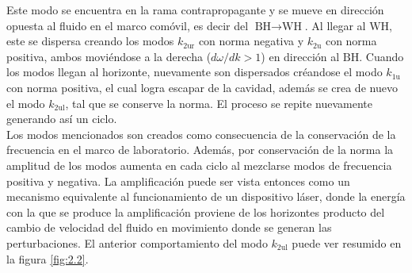 Este modo se encuentra en la rama contrapropagante y se mueve en direcci\'{o}n opuesta al fluido en el marco com\'{o}vil, es decir del $\text{BH}\rightarrow \text{WH}$. Al llegar al $\text{WH}$, este se dispersa creando los modos $k_{2\text{ur}}$ con norma negativa y $k_{2\text{u}}$ con norma positiva, ambos movi\'{e}ndose a la derecha ($d\omega/dk>1$) en direcci\'{o}n al $\text{BH}$. Cuando los modos llegan al horizonte, nuevamente son dispersados cr\'{e}andose el modo $k_{1\text{u}}$ con norma positiva, el cual logra escapar de la cavidad, adem\'{a}s se crea de nuevo el modo $k_{2\text{ul}}$, tal que se conserve la norma. El proceso se repite nuevamente generando as\'{i} un ciclo.\\

Los modos mencionados son creados como consecuencia de la conservaci\'{o}n de la frecuencia en el marco de laboratorio. Adem\'{a}s, por conservaci\'{o}n de la norma la amplitud de los modos aumenta en cada ciclo al mezclarse modos de frecuencia positiva y negativa. La amplificaci\'{o}n puede ser vista entonces como un mecanismo equivalente al funcionamiento de un dispositivo l\'{a}ser, donde la energ\'{i}a con la que se produce la amplificaci\'{o}n proviene de los horizontes producto del cambio de velocidad del fluido en movimiento donde se generan las perturbaciones. El anterior comportamiento del modo $k_{2\text{ul}}$ puede ver resumido en la figura \ref{fig:2.2}.







